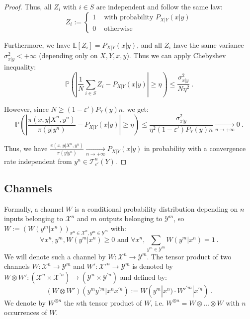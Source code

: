 \begin{proof}
        Thus, all $Z_i$ with $i \in S$ are independent and follow the same law:      
          \[ Z_i := \begin{cases}
            1 & \text{ with probability } P_{X|Y}(x|y) \\
            0 & \text{ otherwise}
          \end{cases}
          \]


          Furthermore, we have $\mathbb{E}[Z_i] = P_{X|Y}(x|y)$, and all $Z_i$ have the same variance $\sigma_{x|y}^2 < +\infty$ (depending only on $X,Y,x,y$). Thus we can apply Chebyshev inequality:
          \[ \mathbb{P}\left( \left|\frac{1}{N}\sum_{i \in S} Z_i - P_{X|Y}(x|y) \right| \geq \eta \right) \leq \frac{\sigma_{x|y}^2}{N\eta^2} \ .\]

          However, since $N \geq (1-\varepsilon')P_Y(y)n$, we get:
          \[ \mathbb{P}\left( \left|\frac{\pi(x,y|X^n,y^n)}{\pi(y|y^n)} - P_{X|Y}(x|y) \right| \geq \eta \right) \leq \frac{\sigma_{x|y}^2}{\eta^2(1-\varepsilon')P_Y(y)n} \underset{n \rightarrow +\infty}{\rightarrow} 0 \ .\]

          Thus, we have $\frac{\pi(x,y|X^n,y^n)}{\pi(y|y^n)} \underset{n \rightarrow +\infty}{\rightarrow} P_{X|Y}(x|y)$ in probability with a convergence rate independent from $y^n \in \mathcal{T}^n_{\varepsilon'}(Y)$.
      \end{proof}

\subsection{Channels}
Formally, a channel $W$ is a conditional probability distribution depending on $n$ inputs belonging to $\mathcal{X}^n$ and $m$ outputs belonging to $\mathcal{Y}^m$, so $W := \left(W(y^m|x^n)\right)_{x^n \in \mathcal{X}^n, y^m \in \mathcal{Y}^m}$ with:
  \[ \forall x^n,y^m, W(y^m|x^n) \geq 0 \text{ and } \forall x^n, \sum_{y^m \in \mathcal{Y}^m} W(y^m|x^n) = 1 \ . \]
We will denote such a channel by $W : \mathcal{X}^n \rightarrow \mathcal{Y}^m$. The tensor product of two channels $W: \mathcal{X}^n \rightarrow \mathcal{Y}^m$ and $W': \mathcal{X}'^n \rightarrow \mathcal{Y}^m$ is denoted by $W \otimes W' : (\mathcal{X}^n \times \mathcal{X}^{\prime n}) \to  (\mathcal{Y}^n \times \mathcal{Y}^{\prime n})$ and defined by:
\[ (W \otimes W')(y^my^{\prime m}|x^nx^{\prime n}) := W(y^m|x^n) \cdot W'^{\prime m}|x^{\prime n}) \ .\]
We denote by $W^{\otimes n}$ the $n$th tensor product of $W$, i.e. $W^{\otimes n} = W \otimes \ldots \otimes W$ with $n$ occurrences of $W$.

